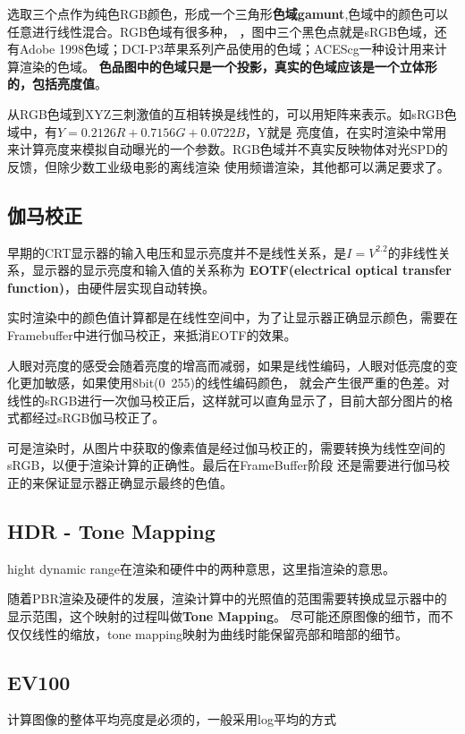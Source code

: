 选取三个点作为纯色RGB颜色，形成一个三角形\textbf{色域gamunt},色域中的颜色可以任意进行线性混合。RGB色域有很多种，
，图中三个黑色点就是sRGB色域，还有Adobe 1998色域；DCI-P3苹果系列产品使用的色域；ACEScg一种设计用来计算渲染的色域。
\textbf{色品图中的色域只是一个投影，真实的色域应该是一个立体形的，包括亮度值}。

从RGB色域到XYZ三刺激值的互相转换是线性的，可以用矩阵来表示。如sRGB色域中，有$Y = 0.2126R + 0.7156G + 0.0722B$，Y就是
亮度值，在实时渲染中常用来计算亮度来模拟自动曝光的一个参数。RGB色域并不真实反映物体对光SPD的反馈，但除少数工业级电影的离线渲染
使用频谱渲染，其他都可以满足要求了。

\subsection{伽马校正}

早期的CRT显示器的输入电压和显示亮度并不是线性关系，是$I=V^{2.2}$的非线性关系，显示器的显示亮度和输入值的关系称为
\textbf{EOTF(electrical optical transfer function)}，由硬件层实现自动转换。

实时渲染中的颜色值计算都是在线性空间中，为了让显示器正确显示颜色，需要在Framebuffer中进行伽马校正，来抵消EOTF的效果。

人眼对亮度的感受会随着亮度的增高而减弱，如果是线性编码，人眼对低亮度的变化更加敏感，如果使用8bit(0~255)的线性编码颜色，
就会产生很严重的色差。对线性的sRGB进行一次伽马校正后，这样就可以直角显示了，目前大部分图片的格式都经过sRGB伽马校正了。

可是渲染时，从图片中获取的像素值是经过伽马校正的，需要转换为线性空间的sRGB，以便于渲染计算的正确性。最后在FrameBuffer阶段
还是需要进行伽马校正的来保证显示器正确显示最终的色值。

\subsection{HDR - Tone Mapping}
hight dynamic range在渲染和硬件中的两种意思，这里指渲染的意思。

随着PBR渲染及硬件的发展，渲染计算中的光照值的范围需要转换成显示器中的显示范围，这个映射的过程叫做\textbf{Tone Mapping}。
尽可能还原图像的细节，而不仅仅线性的缩放，tone mapping映射为曲线时能保留亮部和暗部的细节。

\subsection{EV100}

计算图像的整体平均亮度是必须的，一般采用log平均的方式

